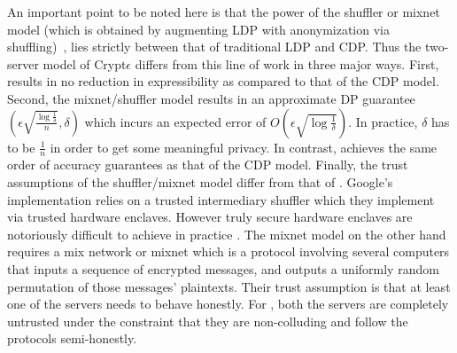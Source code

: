 An important point to be noted here is that the power of the shuffler or mixnet model  (which is obtained by augmenting \textsf{LDP} with anonymization via shuffling)~\cite{Prochlo, mixnets,amplification},  lies strictly between that of traditional \textsf{LDP} and \textsf{CDP}. Thus the two-server model of Crypt$\epsilon$ differs from this line of work in three major ways. First, \system results in no reduction in expressibility as compared to that of the \textsf{CDP} model. Second, the mixnet/shuffler model results in an approximate DP guarantee $(\epsilon\sqrt{\frac{\log\frac{1}{\delta}}{n}},\delta)$ which incurs an expected error of $O(\epsilon\sqrt{\log\frac{1}{\delta}})$.  In practice, $\delta$ has to be  $\frac{1}{n}$ in order to get some meaningful privacy. In contrast, \system achieves the same order of accuracy guarantees as that of the \textsf{CDP} model. Finally, the trust assumptions of the shuffler/mixnet model differ from that of \system. Google's implementation relies on a trusted intermediary shuffler which they implement via trusted hardware enclaves. However truly secure hardware enclaves are notoriously difficult to achieve in practice \cite{Foreshadow}. The mixnet model on the other hand requires a  mix network or mixnet which is a protocol involving several computers that inputs a sequence of encrypted messages, and outputs a uniformly random permutation of those messages' plaintexts.  Their trust assumption is that at least one of the servers needs to behave honestly. For \system, both the servers are completely untrusted under the constraint that they are non-colluding and follow the protocols semi-honestly.
